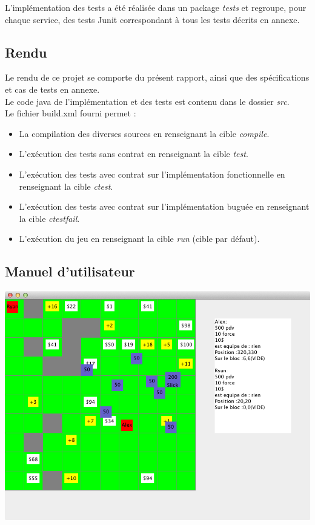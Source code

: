 \documentclass[a4paper, 11pt, notitlepage]{article}
\begin{document}
L'implémentation des tests a été réalisée dans un package \emph{tests} et regroupe, pour chaque service, des tests Junit correspondant à tous les tests décrits en annexe.

\subsection{Rendu}

Le rendu de ce projet se comporte du présent rapport, ainsi que des spécifications et cas de tests en annexe. \\
Le code java de l'implémentation et des tests est contenu dans le dossier \emph{src}. \\

Le fichier build.xml fourni permet : \\

\begin{itemize}
\item La compilation des diverses sources en renseignant la cible \emph{compile}.  \\
\item L'exécution des tests sans contrat en renseignant la cible \emph{test}. \\
\item L'exécution des tests avec contrat sur l'implémentation fonctionnelle en renseignant la cible \emph{ctest}. \\
\item L'exécution des tests avec contrat sur l'implémentation buguée en renseignant la cible \emph{ctestfail}. \\
\item L'exécution du jeu en renseignant la cible \emph{run} (cible par défaut).\\
\end{itemize}


\subsection{Manuel d'utilisateur}

\noindent
\includegraphics[scale=0.55]{capture.png}
\end{document}

